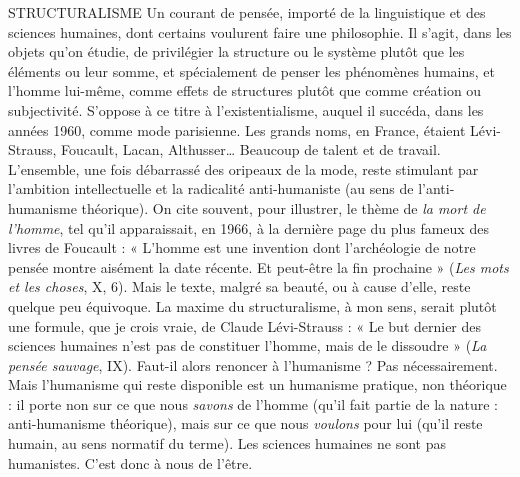 STRUCTURALISME Un courant de pensée, importé de la linguistique et
des sciences humaines, dont certains voulurent faire
une philosophie. Il s’agit, dans les objets qu’on étudie, de privilégier la structure
ou le système plutôt que les éléments ou leur somme, et spécialement de
penser les phénomènes humains, et l’homme lui-même, comme effets de structures
plutôt que comme création ou subjectivité. S’oppose à ce titre à l’existentialisme,
auquel il succéda, dans les années 1960, comme mode parisienne. Les
grands noms, en France, étaient Lévi-Strauss, Foucault, Lacan, Althusser…
Beaucoup de talent et de travail. L'ensemble, une fois débarrassé des oripeaux
de la mode, reste stimulant par l’ambition intellectuelle et la radicalité anti-humaniste
(au sens de l’anti-humanisme théorique). On cite souvent, pour
illustrer, le thème de {\it la mort de l'homme}, tel qu’il apparaissait, en 1966, à la
dernière page du plus fameux des livres de Foucault : « L'homme est une invention
dont l’archéologie de notre pensée montre aisément la date récente. Et
peut-être la fin prochaine » ({\it Les mots et les choses}, X, 6). Mais le texte, malgré sa
beauté, ou à cause d’elle, reste quelque peu équivoque. La maxime du structuralisme,
à mon sens, serait plutôt une formule, que je crois vraie, de Claude
Lévi-Strauss : « Le but dernier des sciences humaines n’est pas de constituer
l'homme, mais de le dissoudre » ({\it La pensée sauvage}, IX). Faut-il alors renoncer
à l’humanisme ? Pas nécessairement. Mais l’humanisme qui reste disponible est
un humanisme pratique, non théorique : il porte non sur ce que nous {\it savons} de
l’homme (qu’il fait partie de la nature : anti-humanisme théorique), mais sur ce
que nous {\it voulons} pour lui (qu’il reste humain, au sens normatif du terme). Les
sciences humaines ne sont pas humanistes. C’est donc à nous de l’être.

